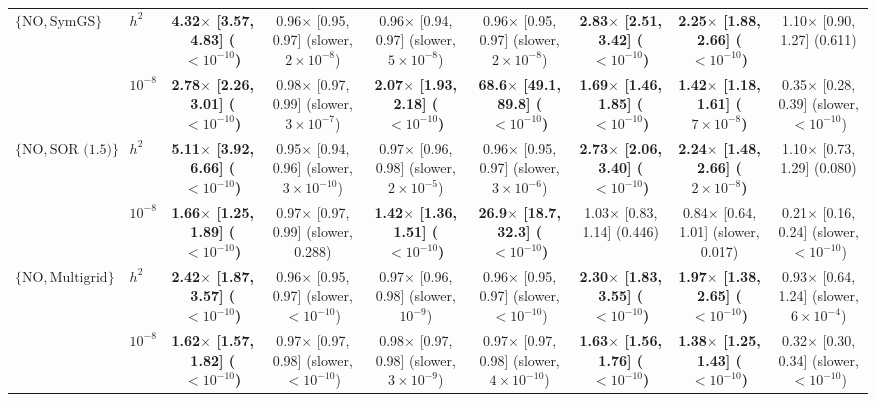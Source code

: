 {\begin{tabular}{llccccccc}
$\{\mathrm{NO}, \text{SymGS}\}$ & $h^2$ & \textbf{4.32$\times$ [3.57, 4.83] ($<10^{-10}$)} & 0.96$\times$ [0.95, 0.97] (slower, $2\times10^{-8}$) & 0.96$\times$ [0.94, 0.97] (slower, $5\times10^{-8}$) & 0.96$\times$ [0.95, 0.97] (slower, $2\times10^{-8}$) & \textbf{2.83$\times$ [2.51, 3.42] ($<10^{-10}$)} & \textbf{2.25$\times$ [1.88, 2.66] ($<10^{-10}$)} & 1.10$\times$ [0.90, 1.27] (0.611) \\
 & $10^{-8}$ & \textbf{2.78$\times$ [2.26, 3.01] ($<10^{-10}$)} & 0.98$\times$ [0.97, 0.99] (slower, $3\times10^{-7}$) & \textbf{2.07$\times$ [1.93, 2.18] ($<10^{-10}$)} & \textbf{68.6$\times$ [49.1, 89.8] ($<10^{-10}$)} & \textbf{1.69$\times$ [1.46, 1.85] ($<10^{-10}$)} & \textbf{1.42$\times$ [1.18, 1.61] ($7\times10^{-8}$)} & 0.35$\times$ [0.28, 0.39] (slower, $<10^{-10}$) \\
$\{\mathrm{NO}, \text{SOR (1.5)}\}$ & $h^2$ & \textbf{5.11$\times$ [3.92, 6.66] ($<10^{-10}$)} & 0.95$\times$ [0.94, 0.96] (slower, $3\times10^{-10}$) & 0.97$\times$ [0.96, 0.98] (slower, $2\times10^{-5}$) & 0.96$\times$ [0.95, 0.97] (slower, $3\times10^{-6}$) & \textbf{2.73$\times$ [2.06, 3.40] ($<10^{-10}$)} & \textbf{2.24$\times$ [1.48, 2.66] ($2\times10^{-8}$)} & 1.10$\times$ [0.73, 1.29] (0.080) \\
 & $10^{-8}$ & \textbf{1.66$\times$ [1.25, 1.89] ($<10^{-10}$)} & 0.97$\times$ [0.97, 0.99] (slower, 0.288) & \textbf{1.42$\times$ [1.36, 1.51] ($<10^{-10}$)} & \textbf{26.9$\times$ [18.7, 32.3] ($<10^{-10}$)} & 1.03$\times$ [0.83, 1.14] (0.446) & 0.84$\times$ [0.64, 1.01] (slower, 0.017) & 0.21$\times$ [0.16, 0.24] (slower, $<10^{-10}$) \\
$\{\mathrm{NO}, \text{Multigrid}\}$ & $h^2$ & \textbf{2.42$\times$ [1.87, 3.57] ($<10^{-10}$)} & 0.96$\times$ [0.95, 0.97] (slower, $<10^{-10}$) & 0.97$\times$ [0.96, 0.98] (slower, $10^{-9}$) & 0.96$\times$ [0.95, 0.97] (slower, $<10^{-10}$) & \textbf{2.30$\times$ [1.83, 3.55] ($<10^{-10}$)} & \textbf{1.97$\times$ [1.38, 2.65] ($<10^{-10}$)} & 0.93$\times$ [0.64, 1.24] (slower, $6\times10^{-4}$) \\
 & $10^{-8}$ & \textbf{1.62$\times$ [1.57, 1.82] ($<10^{-10}$)} & 0.97$\times$ [0.97, 0.98] (slower, $<10^{-10}$) & 0.98$\times$ [0.97, 0.98] (slower, $3\times10^{-9}$) & 0.97$\times$ [0.97, 0.98] (slower, $4\times10^{-10}$) & \textbf{1.63$\times$ [1.56, 1.76] ($<10^{-10}$)} & \textbf{1.38$\times$ [1.25, 1.43] ($<10^{-10}$)} & 0.32$\times$ [0.30, 0.34] (slower, $<10^{-10}$) \\
\bottomrule
\end{tabular}}
